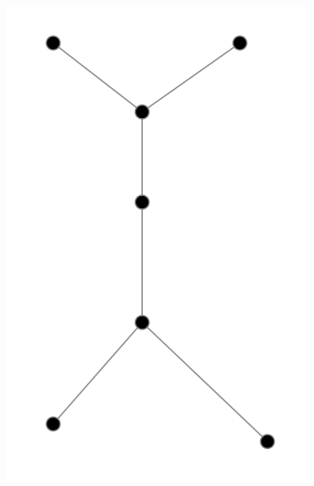 \begin{figure}[ht]
  \centering
  \begin{minipage}[t]{0.2\textwidth}
    \includegraphics[width=\textwidth]{asset/20230924092520.png}
    \caption{}
    \label{fig:img27_1}
  \end{minipage}%
  \hspace{1em}
  \begin{minipage}[t]{0.3\textwidth}

\end{minipage}
\end{figure}
